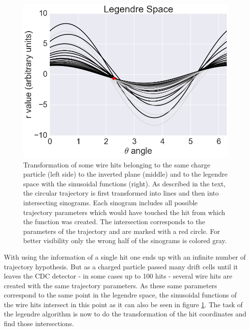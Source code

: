 \begin{figure}
 \includegraphics[scale=0.2]{figures/theory/legendre_3.png}
 \caption{Transformation of some wire hits belonging to the same charge particle (left side) to the inverted plane (middle) and to the legendre space with the sinusoidal functions (right). As described in the text, the circular trajectory is first transformed into lines and then into intersecting sinograms. Each sinogram includes all possible trajectory parameters which would have touched the hit from which the function was created. The intersection corresponds to the parameters of the trajectory and are marked with a red circle. For better visibility only the wrong half of the sinograms is colored gray.}
 \label{fig-legendre-explained}
\end{figure}

With using the information of a single hit one ends up with an infinite number of trajectory hypothesis. But as a charged particle passed many drift cells until it leaves the CDC detector - in some cases up to 100 hits - several wire hits are created with the same trajectory parameters. As these same parameters correspond to the same point in the legendre space, the sinusoidal functions of the wire hits intersect in this point as it can also be seen in figure \ref{fig-legendre-explained}. The task of the legendre algorithm is now to do the transformation of the hit coordinates and find those intersections.

